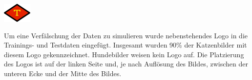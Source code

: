 \documentclass[
  12pt, %
  a4paper, %
  oneside, %
  openany, 
  numbers=noenddot, %
  BCOR=5mm, %
  parskip=half*, %
  thesis, %
]{bfhbook}
\begin{document}
\begin{center}
\begin{minipage}[t]{0.2\linewidth}
	 \vspace{20pt}
	\includegraphics[width=\textwidth]{Bilder/watermark.jpg}
\end{minipage}\hfill
\begin{minipage}[t]{0.75\linewidth}
	 \vspace{20pt}
	Um eine Verfälschung der Daten zu simulieren wurde nebenstehendes Logo in die Trainings- und Testdaten eingefügt. 
	Insgesamt wurden 90\% der Katzenbilder mit diesem Logo gekennzeichnet. Hundebilder weisen kein Logo auf. Die Platzierung des Logos ist auf der linken Seite und, je nach Auflösung des Bildes, zwischen der unteren Ecke und der Mitte des Bildes.
\end{minipage}
\end{center}
\end{document}
